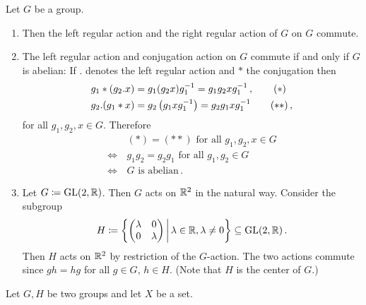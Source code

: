 \begin{example}
  \label{example: commuting actions}
  Let $G$ be a group.
  \begin{enumerate}
    \item
      Then the left regular action and the right regular action of $G$ on $G$ commute.
    \item
      The left regular action and conjugation action on $G$ commute if and only if $G$ is abelian:
      If $.$ denotes the left regular action and $*$ the conjugation then
      \begin{align*}
            g_1*(g_2.x)
        &=  g_1 (g_2 x) g_1^{-1}
         =  g_1 g_2 x g_1^{-1} \,,
        \tag{\ensuremath{\ast}}
        \\
            g_2.(g_1*x)
        &=  g_2 \left(g_1 x g_1^{-1}\right)
         =  g_2 g_1 x g_1^{-1}
        \tag{\ensuremath{\ast\ast}} \,,
      \end{align*}
      for all $g_1, g_2, x \in G$.
      Therefore
      \begin{align*}
            &\, \text{$(\ast) = (\ast\ast)$ for all $g_1, g_2, x \in G$}  \\
        \iff&\, \text{$g_1 g_2 = g_2 g_1$ for all $g_1, g_2 \in G$}       \\
        \iff&\, \text{$G$ is abelian} \,.
      \end{align*}
    \item
      Let $G \coloneqq \operatorname{GL}(2,\mathbb{R})$.
      Then $G$ acts on $\mathbb{R}^2$ in the natural way.
      Consider the subgroup
      \[
                  H
        \defined  \left\{
                    \begin{pmatrix}
                      \lambda & 0       \\
                      0       & \lambda
                    \end{pmatrix}
                  \suchthat*
                    \lambda \in \Real,
                    \lambda \neq 0
                  \right\}
        \subseteq \GL(2,\Real) \,.
      \]
      Then $H$ acts on $\mathbb{R}^2$ by restriction of the $G$-action.
      The two actions commute since $gh = hg$ for all $g \in G$, $h \in H$.
      (Note that $H$ is the center of $G$.)
  \end{enumerate}
\end{example}


\begin{remark}
  Let $G, H$ be two groups and let $X$ be a set.
\end{remark}




